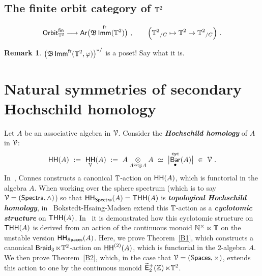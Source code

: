 \documentclass{amsart}
\theoremstyle{definition}
\newtheorem{remark}[theorem]{Remark}
\theoremstyle{remark}
\DeclareMathOperator{\bBar}{\sf Bar}
\newcommand{\bit}[1]{\textbf{\textit{#1}}}
\DeclareMathOperator{\Ar}{{\sf Ar}}
\DeclareMathOperator{\op}{\mathsf{op}}
\DeclareMathOperator{\Spaces}{\cS\mathsf{paces}}
\DeclareMathOperator{\fr}{\sf fr}
\def\ot{\otimes}
\newcommand{\w}{\widetilde}
\DeclareMathOperator{\Braid}{{\sf Braid}_3}
\DeclareMathOperator{\Ebraid}{\w{\sf E}_{2}^{+}(\ZZ)}
\DeclareMathOperator{\sHH}{\sf HH}
\DeclareMathOperator{\Imm}{\sf Imm}
\begin{document}
{\color{magenta}


\subsection{The finite orbit category of $\mathbb T^2$}




\begin{equation}
\label{t75}
{\sf Orbit}^{\sf fin}_{\TT^2}
\longrightarrow
\Ar\bigl( \fB \Imm^{\fr}(\TT^2) \bigr)
~,\qquad
\Bigl(
{\TT^2}_{/C}
\mapsto 
\TT^2 \to {\TT^2}_{/C}
\Bigr)
~.
\end{equation}













\begin{remark}
$\bigl(\fB \Imm^{\fr}(\TT^2,\varphi) \bigr)^{\ast/}$ is a poset!
Say what it is.
\end{remark}





}
























\section{Natural symmetries of secondary Hochschild homology}

Let $A$ be an associative algebra in $\mathcal V$.  
Consider the \bit{Hochschild homology} of $A$ in $\mathcal V$:
\[
\sHH(A)
~:=~
\sHH_\cV(A) 
~:= ~
A \underset{ A^{\op}\ot A} \ot A
~\simeq~
\bigl|
\bBar_\bullet^{\sf cyc}(A)
\bigr|
~\in~ \cV
~.
\]
In~\cite{connes??}, Connes constructs a canonical $\mathbb T$-action on $\sHH(A)$, which is functorial in the algebra $A$.
When working over the sphere spectrum (which is to say $\mathcal V = ({\sf Spectra},\wedge)$) so that $\sHH_{\sf Spectra}(A) = {\sf THH}(A)$ is \bit{topological Hochschild homology}, in~\cite{??} Bokstedt-Hsaing-Madsen extend this $\mathbb T$-action as a \bit{cyclotomic structure} on ${\sf THH}(A)$.  
In~\cite{cyclo} it is demonstrated how this cyclotomic structure on ${\sf THH}(A)$ is derived from an action of the continuous monoid $\mathbb N^\times \ltimes \mathbb T$ on the unstable version $\sHH_{\Spaces}(A)$.
Here, we prove Theorem~\ref{B1}, which constructs a canonical $\Braid \ltimes \TT^2$-action on $\sHH^{(2)}(A)$, which is functorial in the 2-algebra $A$.  
We then prove Theorem~\ref{B2}, which, in the case that $\cV = (\Spaces,\times)$, extends this action to one by the continuous monoid $\Ebraid \ltimes \TT^2$.  
\end{document}

